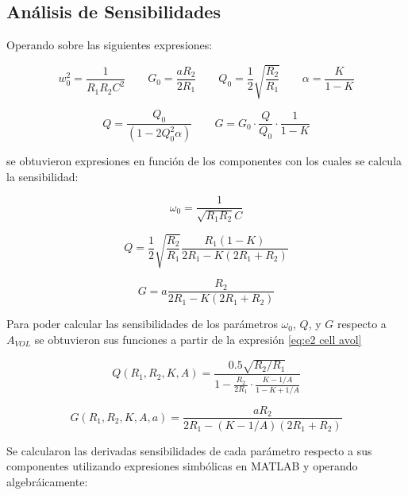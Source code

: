 \subsection{Análisis de Sensibilidades}

Operando sobre las siguientes expresiones:

\begin{equation*}
w_0^2=\frac{1}{R_1R_2C^2} \qquad G_0 = \frac{aR_2}{2R_1} \qquad Q_0=\frac{1}{2}\sqrt{\frac{R_2}{R_1}} \qquad	\alpha=\frac{K}{1-K}
\end{equation*}

\begin{equation*}
Q = \frac{Q_0}{\left(1-2 Q_0^2\alpha\right)} \qquad	G=G_0\cdot\frac{Q}{Q_0}\cdot\frac{1}{1-K}
\end{equation*}

se obtuvieron expresiones en función de los componentes con los cuales se calcula la sensibilidad:

\begin{equation}
\omega_0 = \frac{1}{\sqrt{R_1 R_2}C}
\end{equation}

\begin{equation}
Q=\frac{1}{2} \sqrt{\frac{R_2}{R_1}} \frac{R_1(1-K)}{2R_1-K(2R_1+R_2)}
\end{equation}

\begin{equation}
G=a\frac{R_2}{2R_1-K(2R_1+R_2)}
\end{equation}

Para poder calcular las sensibilidades de los parámetros $\omega_0$, $Q$, y $G$ respecto a $A_{VOL}$ se obtuvieron sus funciones a partir de la expresión \eqref{eq:e2 cell avol}

\begin{equation}
Q (R_1,R_2,K,A)= \frac{0.5 \sqrt{R_2/R_1}}{1 - \frac{R_2}{2R_1}\cdot \frac{K-1/A}{1-K+1/A}}
\end{equation}

\begin{equation}
G (R_1,R_2,K,A,a) = \frac{a R_2}{2R_1-(K-1/A)(2R_1+R_2)}
\end{equation}

Se calcularon las derivadas sensibilidades de cada parámetro respecto a sus componentes utilizando expresiones simbólicas en MATLAB y operando algebráicamente:

